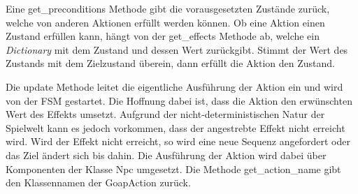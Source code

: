 Eine get\_preconditions Methode gibt die vorausgesetzten Zustände zurück, welche von anderen Aktionen erfüllt werden können. Ob eine Aktion einen Zustand erfüllen kann, hängt von der get\_effects Methode ab, welche ein \textit{Dictionary} mit dem Zustand und dessen Wert zurückgibt. Stimmt der Wert des Zustands mit dem Zielzustand überein, dann erfüllt die Aktion den Zustand.

Die update Methode leitet die eigentliche Ausführung der Aktion ein und wird von der FSM gestartet. Die Hoffnung dabei ist, dass die Aktion den erwünschten Wert des Effekts umsetzt. Aufgrund der nicht-deterministischen Natur der Spielwelt kann es jedoch vorkommen, dass der angestrebte Effekt nicht erreicht wird. Wird der Effekt nicht erreicht, so wird eine neue Sequenz angefordert oder das Ziel ändert sich bis dahin. Die Ausführung der Aktion wird dabei über Komponenten der Klasse Npc umgesetzt. Die Methode get\_action\_name gibt den Klassennamen der GoapAction zurück.

%

